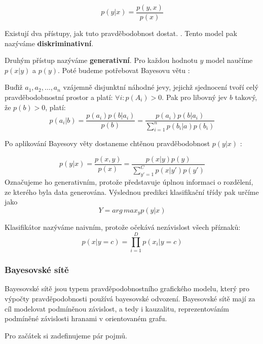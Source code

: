 \begin{definition}
    $$ p(y|x) = \frac{p(y,x)}{p(x)} $$
    \end{definition}

Existují dva přístupy, jak tuto pravděbodobnost dostat. \cite{naiveBayes}  \cite[překlad vlasntí]{naiveBayes}. Tento model pak nazýváme \textbf{diskriminativní}.

Druhým přístup nazýváme \textbf{generativní}. Pro každou hodnotu $y$ model naučíme $p(x|y)$ a $p(y)$. Poté budeme potřebovat Bayesovu větu \cite{prob}:

    \begin{definition}
        Buďiž $a_1, a_2, \hdots, a_n$ vzájemně disjunktní náhodné jevy, jejichž sjednocení tvoří celý pravděbodobnostní prostor a platí: $\forall i : p(A_i) > 0 $. Pak pro libovný jev $b$ takový, že $p(b) > 0$, platí: 
        $$p(a_i|b) = \frac{p(a_i)p(b|a_i)}{p(b)} = \frac{p(a_i)p(b|a_i)}{\sum_{i=1}^{n}p(b_i|a)p(b_i)}$$
        \end{definition}

Po aplikování Bayesovy věty dostaneme chtěnou pravděbodobnost $p(y|x)$ \cite{naiveBayes}:

$$p(y|x) = \frac{p(x,y)}{p(x)} = \frac{p(x|y)p(y)}{\sum_{y' = 1}^{C}p(x|y')p(y')}$$
Označujeme ho generativním, protože představuje úplnou informaci o rozdělení, ze kterého byla data generována. Výslednou predikci klasifikační třídy pak určíme jako 
$$ Y = arg\,max_y p(y|x)$$

Klasifikátor nazýváme naivním, protože očekává nezávislost všech příznaků:
$$ p(x|y = c) = \prod_{i=1}^{D}p(x_i|y = c)$$
\cite[překlad vlastní]{naiveBayes}

\subsubsection{Bayesovské sítě}

Bayesovské sítě jsou typem pravděpodobnostního grafického modelu, který pro výpočty pravděpodobnosti používá bayesovské odvození. Bayesovské sítě mají za cíl modelovat podmíněnou závislost, a tedy i kauzalitu, reprezentováním podmíněné závislosti hranami v orientovaném grafu.

Pro začátek si zadefinujeme pár pojmů. 


